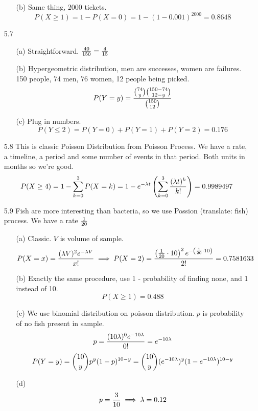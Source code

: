 \documentclass[english, 11pt]{article}
\begin{document}
\begin{itemize}
\begin{itemize}
      \item[(b)] Same thing, 2000 tickets.
      \[ P(X \geq 1) = 1 - P(X = 0) = 1 - (1-0.001)^{2000} = 0.8648 \]
    \end{itemize}

    \item[5.7]
    \begin{itemize}
      \item[(a)]
      Straightforward. $\frac{40}{150} = \frac{4}{15}$
      \item[(b)] Hypergeometric distribution, men are successes, women are failures. 150 people, 74 men, 76 women, 12 people being picked.
      \[ P(Y = y) = \frac{{74 \choose y}{150 - 74 \choose 12 - y}}{{150 \choose 12}} \]

      \item[(c)] Plug in numbers.
      \[ P(Y \leq 2) = P(Y = 0) + P(Y = 1) + P(Y = 2) = 0.176\]
    \end{itemize}

    \item[5.8] This is classic Poisson Distribution from Poisson Process. We have a rate, a timeline, a period and some number of events in that period. Both units in months so we're good.
    \[ P(X \geq 4) = 1 -  \sum_{k=0}^{3} P(X = k) = 1 - e^{-\lambda t}\left( \sum_{k=0}^{3} \frac{(\lambda t)^k}{k!} \right) = 0.9989497\]

    \item[5.9] Fish are more interesting than bacteria, so we use Possion (translate: fish) process. We have a rate $\frac{1}{20}$
    \begin{itemize}
      \item[(a)] Classic. $V$ is volume of sample.
      \[ P(X = x) = \frac{(\lambda V)^2e^{-\lambda V}}{x!} \implies P(X = 2) = \frac{\left( \frac{1}{20} \cdot 10 \right)^2e^{-\left( \frac{1}{20} \cdot 10 \right)}}{2!} = 0.7581633 \]

      \item[(b)]
      Exactly the same procedure, use 1 - probability of finding none, and 1 instead of 10.
      \[ P(X \geq 1) = 0.488 \]
      \item[(c)] We use binomial distribution on poisson distribution. $p$ is probability of no fish present in sample.
      \[ p = \frac{(10\lambda)^0 e^{-10\lambda}}{0!} = e^{-10\lambda} \]
      \[ P(Y = y) = {10 \choose y} p^y(1-p)^{10-y} = {10 \choose y} (e^{-10\lambda})^y(1-e^{-10\lambda})^{10-y} \]
      \item[(d)]
      \[ p = \frac{3}{10} \implies \lambda = 0.12 \]
    \end{itemize}


\end{itemize}
\end{document}
